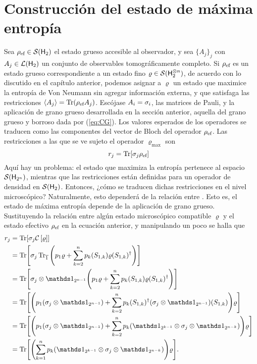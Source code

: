 \section{Construcción del estado de máxima entropía}

Sea $\rho_{\text{ef}}\in\mathcal{S}({\sf H}_{2})$ el estado grueso accesible al observador, y sea $\{A_{j}\}_{j}$ con $A_{j}\in\mathcal{L}({\sf H}_{2})$ un conjunto de observables tomográficamente completo.
Si $\rho_{\text{ef}}$ es un estado grueso correspondiente a un estado fino $\varrho\in\mathcal{S}({\sf H}_{2}^{\otimes n})$, de acuerdo con lo discutido en el capítulo anterior, podemos asignar a $\varrho$ un estado que maximice la entropía de Von Neumann sin agregar  {información externa, y que satisfaga las restricciones $\expval{A_{j}}=\Tr(\rho_{\text{ef}} A_{j})$}.
Escójase ${A_{i}}={\sigma_{i}}$, las matrices de Pauli, y la aplicación de grano grueso desarrollada en la sección anterior, aquella del grano grueso y borroso dada por (\ref{eq:CG}). Los valores esperados de los operadores se traducen como las componentes del vector de Bloch del operador $\rho_{\text{ef}}$. Las restricciones a las que se ve sujeto el operador $\varrho_{\max}$ son
\begin{equation*}
    r_{j}=\Tr[\sigma_{j}\rho_{\text{ef}}]
\end{equation*}
Aquí hay un problema: el estado que maximiza la entropía pertenece al espacio $\mathcal{S}({\sf H}_{2^{n}})$, mientras que las restricciones están definidas para un operador de densidad en $\mathcal{S}({\sf H}_{2})$. Entonces, ¿cómo se traducen dichas restricciones en el nivel microscópico? Naturalmente, esto dependerá de la relación entre . Esto es, el estado de máxima entropía depende de la aplicación de grano grueso. Sustituyendo la relación entre algún estado microscópico compatible $\varrho$ y el estado efectivo $\rho_{\text{ef}}$ en la ecuación anterior, y manipulando un poco se halla que
\begin{align*}
    r_{j}&=\Tr[\sigma_{j}\CG{\varrho}]\\
    &=\Tr[\sigma_{j}\Tr_{\overline{1}}\qty(p_{1}\varrho+\sum_{k=2}^{n}p_{k}(S_{1,k})\varrho(S_{1,k})^{\dagger})]\\
    &=\Tr[\sigma_{j}\otimes\Id_{2^{n-1}}\qty(p_{1}\varrho+\sum_{k=2}^{n}p_{k}(S_{1,k})\varrho(S_{1,k})^{\dagger})]\\
    &=\Tr[\qty(p_{1}(\sigma_{j}\otimes\Id_{2^{n-1}})+\sum_{k=2}^{n}p_{k}(S_{1,k})^{\dagger}(\sigma_{j}\otimes\Id_{2^{n-1}})(S_{1,k}))\varrho]\\
    &=\Tr[\qty(p_{1}(\sigma_{j}\otimes\Id_{2^{n-1}})+\sum_{k=2}^{n}p_{k}(\Id_{2^{k-1}}\otimes\sigma_{j}\otimes\Id_{2^{n-k}}))\varrho]\\
    &=\Tr[\qty(\sum_{k=1}^{n}p_{k}(\Id_{2^{k-1}}\otimes\sigma_{j}\otimes\Id_{2^{n-k}}))\varrho].
\end{align*}
